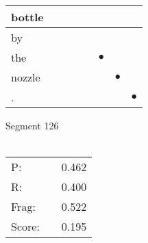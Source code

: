 \documentclass[landscape]{article}
\newcommand{\ssp}{\hspace{2pt}}
\newcommand{\mex}{\cellcolor{g}$\bullet$}
\begin{document}
\begin{tabular}{|l|p{10pt}|p{10pt}|p{10pt}|p{10pt}|p{10pt}|p{10pt}|p{10pt}|}
\hline
\ssp bottle \ssp&\hspace{2pt}&\hspace{2pt}&\hspace{2pt}&\hspace{2pt}&\hspace{2pt}&\hspace{2pt}&\hspace{2pt}\\
\hline
\ssp by \ssp&\hspace{2pt}&\hspace{2pt}&\hspace{2pt}&\hspace{2pt}&\hspace{2pt}&\hspace{2pt}&\hspace{2pt}\\
\hline
\ssp \cellcolor{ref4}the \ssp&\hspace{2pt}&\hspace{2pt}&\hspace{2pt}&\hspace{2pt}&\hspace{2pt}\mex&\hspace{2pt}&\hspace{2pt}\\
\hline
\ssp \cellcolor{ref5}nozzle \ssp&\hspace{2pt}&\hspace{2pt}&\hspace{2pt}&\hspace{2pt}&\hspace{2pt}&\hspace{2pt}\mex&\hspace{2pt}\\
\hline
\ssp \cellcolor{ref6}. \ssp&\hspace{2pt}&\hspace{2pt}&\hspace{2pt}&\hspace{2pt}&\hspace{2pt}&\hspace{2pt}&\hspace{2pt}\mex\\
\hline
\end{tabular}

\vspace{6pt}
\noindent Segment 126\\\\
\noindent\begin{tabular}{lm{12pt}r}
\hline
P:&&0.462\\
R:&&0.400\\
Frag:&&0.522\\
Score:&&0.195\\
\end{tabular}
\end{document}
